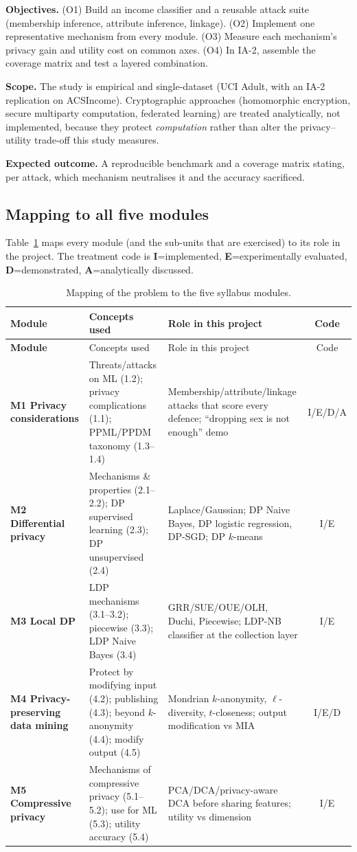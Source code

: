 \documentclass[11pt,a4paper]{article}
\begin{document}
\noindent\textbf{Objectives.} (O1) Build an income classifier and a reusable attack
suite (membership inference, attribute inference, linkage). (O2) Implement one
representative mechanism from every module. (O3) Measure each mechanism's
privacy gain and utility cost on common axes. (O4) In IA-2, assemble the
coverage matrix and test a layered combination.

\noindent\textbf{Scope.} The study is empirical and single-dataset (UCI Adult, with an
IA-2 replication on ACSIncome). Cryptographic approaches (homomorphic encryption,
secure multiparty computation, federated learning) are treated analytically, not
implemented, because they protect \emph{computation} rather than alter the
privacy--utility trade-off this study measures.

\noindent\textbf{Expected outcome.} A reproducible benchmark and a coverage matrix
stating, per attack, which mechanism neutralises it and the accuracy sacrificed.

\subsection{Mapping to all five modules}
Table~\ref{tab:modmap} maps every module (and the sub-units that are exercised) to
its role in the project. The treatment code is
\textbf{I}=implemented, \textbf{E}=experimentally evaluated,
\textbf{D}=demonstrated, \textbf{A}=analytically discussed.

\begin{longtable}{>{\bfseries}p{1.5cm}p{6.8cm}p{4.6cm}c}
\caption{Mapping of the problem to the five syllabus modules.}\label{tab:modmap}\\
\toprule
Module & Concepts used & Role in this project & Code\\
\midrule
\endfirsthead
\toprule Module & Concepts used & Role in this project & Code\\ \midrule
\endhead
M1 Privacy considerations & Threats/attacks on ML (1.2); privacy complications (1.1); PPML/PPDM taxonomy (1.3--1.4) & Membership/attribute/linkage attacks that score every defence; ``dropping sex is not enough'' demo & I/E/D/A\\
M2 Differential privacy & Mechanisms \& properties (2.1--2.2); DP supervised learning (2.3); DP unsupervised (2.4) & Laplace/Gaussian; DP Naive Bayes, DP logistic regression, DP-SGD; DP $k$-means & I/E\\
M3 Local DP & LDP mechanisms (3.1--3.2); piecewise (3.3); LDP Naive Bayes (3.4) & GRR/SUE/OUE/OLH, Duchi, Piecewise; LDP-NB classifier at the collection layer & I/E\\
M4 Privacy-preserving data mining & Protect by modifying input (4.2); publishing (4.3); beyond $k$-anonymity (4.4); modify output (4.5) & Mondrian $k$-anonymity, $\ell$-diversity, $t$-closeness; output modification vs MIA & I/E/D\\
M5 Compressive privacy & Mechanisms of compressive privacy (5.1--5.2); use for ML (5.3); utility accuracy (5.4) & PCA/DCA/privacy-aware DCA before sharing features; utility vs dimension & I/E\\
\bottomrule
\end{longtable}
\end{document}
